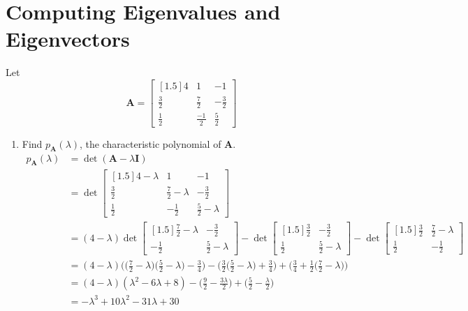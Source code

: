 \documentclass{article}
\begin{document}
\section{Computing Eigenvalues and Eigenvectors}
Let $$\mathbf{A} = \begin{bmatrix}[1.5] 4 & 1 & -1 \\ \frac{3}{2} & \frac{7}{2} & -\frac{3}{2} \\ \frac{1}{2} & \frac{-1}{2} & \frac{5}{2} \end{bmatrix}$$
\begin{enumerate}
\item Find $p_{\mathbf{A}}(\lambda)$, the characteristic polynomial of $\mathbf{A}$. \\
{\color{blue} \begin{align*}
p_{\mathbf{A}}(\lambda) &= 
\det(\mathbf{A} - \lambda\mathbf{I}) \\
&= \det\begin{bmatrix}[1.5] 4 - \lambda & 1 & -1 \\ \frac{3}{2} & \frac{7}{2} - \lambda & -\frac{3}{2} \\ \frac{1}{2} & -\frac{1}{2} & \frac{5}{2} - \lambda \end{bmatrix} \\
&= (4 - \lambda)\det\begin{bmatrix}[1.5] \frac{7}{2} - \lambda & -\frac{3}{2} \\ -\frac{1}{2} & \frac{5}{2} - \lambda\end{bmatrix} - \det\begin{bmatrix}[1.5] \frac{3}{2} & -\frac{3}{2} \\ \frac{1}{2} & \frac{5}{2} - \lambda\end{bmatrix} - \det\begin{bmatrix}[1.5] \frac{3}{2} & \frac{7}{2} - \lambda \\ \frac{1}{2} & -\frac{1}{2}\end{bmatrix} \\
&= (4 - \lambda)\big(\big(\frac{7}{2} - \lambda\big)\big(\frac{5}{2} - \lambda\big) - \frac{3}{4}\big) - \big(\frac{3}{2}\big(\frac{5}{2} - \lambda\big) + \frac{3}{4}\big) + \big(\frac{3}{4} + \frac{1}{2}\big(\frac{7}{2} - \lambda\big)\big) \\
&= (4 - \lambda)(\lambda^2 - 6\lambda + 8) - \big(\frac{9}{2} - \frac{3\lambda}{2}\big) + \big(\frac{5}{2} - \frac{\lambda}{2}\big) \\
&= -\lambda^3 + 10\lambda^2 - 31\lambda + 30
\end{align*}}

\end{enumerate}
\end{document}
